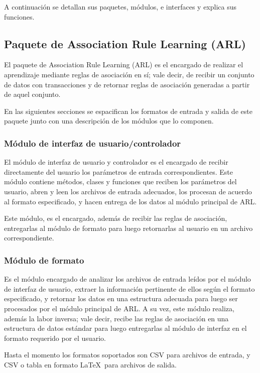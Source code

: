 A continuación se detallan sus paquetes, módulos, e interfaces y explica sus funciones.

\subsection{Paquete de Association Rule Learning (ARL)}

El paquete de Association Rule Learning (ARL) es el encargado de realizar el aprendizaje mediante reglas de asociación en sí; vale decir, de recibir un conjunto de datos con transacciones y de retornar reglas de asociación generadas a partir de aquel conjunto.

En las siguientes secciones se espacifican los formatos de entrada y salida de este paquete junto con una descripción de los módulos que lo componen.

\subsubsection{Módulo de interfaz de usuario/controlador}

El módulo de interfaz de usuario y controlador es el encargado de recibir directamente del usuario los parámetros de entrada correspondientes. Este módulo contiene métodos, clases y funciones que reciben los parámetros del usuario, abren y leen los archivos de entrada adecuados, los procesan de acuerdo al formato especificado, y hacen entrega de los datos al módulo principal de ARL.

Este módulo, es el encargado, además de recibir las reglas de asociación, entregarlas al módulo de formato para luego retornarlas al usuario en un archivo correspondiente.

\subsubsection{Módulo de formato}

Es el módulo encargado de analizar los archivos de entrada leídos por el módulo de interfaz de usuario, extraer la información pertinente de ellos según el formato especificado, y retornar los datos en una estructura adecuada para luego ser procesados por el módulo principal de ARL. A su vez, este módulo realiza, además la labor inversa; vale decir, recibe las reglas de asociación en una estructura de datos estándar para luego entregarlas al módulo de interfaz en el formato requerido por el usuario.

Hasta el momento los formatos soportados son CSV para archivos de entrada, y CSV o tabla en formato \LaTeX\ para archivos de salida.

